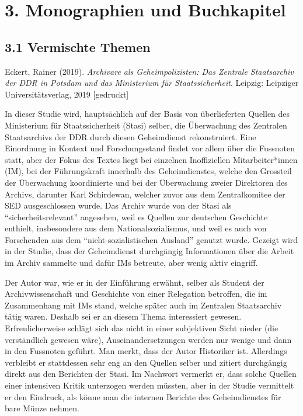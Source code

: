 \documentclass[a4paper,
fontsize=11pt,
oneside,
numbers=noperiodatend,
parskip=half-,
bibliography=totoc,
final
]{scrartcl}
\begin{document}
\hypertarget{monographien-und-buchkapitel}{%
\section{3. Monographien und
Buchkapitel}\label{monographien-und-buchkapitel}}

\hypertarget{vermischte-themen-1}{%
\subsection{3.1 Vermischte Themen}\label{vermischte-themen-1}}

Eckert, Rainer (2019). \emph{Archivare als Geheimpolizisten: Das
Zentrale Staatsarchiv der DDR in Potsdam und das Ministerium für
Staatssicherheit}. Leipzig: Leipziger Universitätsverlag, 2019
{[}gedruckt{]}

In dieser Studie wird, hauptsächlich auf der Basis von überlieferten
Quellen des Ministerium für Staatssicherheit (Stasi) selber, die
Überwachung des Zentralen Staatsarchivs der DDR durch diesen
Geheimdienst rekonstruiert. Eine Einordnung in Kontext und
Forschungsstand findet vor allem über die Fussnoten statt, aber der
Fokus des Textes liegt bei einzelnen Inoffiziellen Mitarbeiter*innen
(IM), bei der Führungskraft innerhalb des Geheimdienstes, welche den
Grossteil der Überwachung koordinierte und bei der Überwachung zweier
Direktoren des Archivs, darunter Karl Schirdewan, welcher zuvor aus dem
Zentralkomitee der SED ausgeschlossen wurde. Das Archiv wurde von der
Stasi als \enquote{sicherheitsrelevant} angesehen, weil es Quellen zur
deutschen Geschichte enthielt, insbesondere aus dem Nationalsozialismus,
und weil es auch von Forschenden aus dem \enquote{nicht-sozialistischen
Ausland} genutzt wurde. Gezeigt wird in der Studie, dass der
Geheimdienst durchgängig Informationen über die Arbeit im Archiv
sammelte und dafür IMs betreute, aber wenig aktiv eingriff.

Der Autor war, wie er in der Einführung erwähnt, selber als Student der
Archivwissenschaft und Geschichte von einer Relegation betroffen, die im
Zusammenhang mit IMs stand, welche später auch im Zentralen Staatsarchiv
tätig waren. Deshalb sei er an diesem Thema interessiert gewesen.
Erfreulicherweise schlägt sich das nicht in einer subjektiven Sicht
nieder (die verständlich gewesen wäre), Auseinandersetzungen werden nur
wenige und dann in den Fussnoten geführt. Man merkt, dass der Autor
Historiker ist. Allerdings verbleibt er stattdessen sehr eng an den
Quellen selber und zitiert durchgängig direkt aus den Berichten der
Stasi. Im Nachwort vermerkt er, dass solche Quellen einer intensiven
Kritik unterzogen werden müssten, aber in der Studie vermittelt er den
Eindruck, als könne man die internen Berichte des Geheimdienstes für
bare Münze nehmen.
\end{document}
